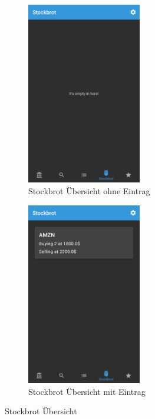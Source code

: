 \documentclass[a4paper]{article}
\begin{document}
\begin{figure}[H]
    \begin{subfigure}{.5\textwidth}
        \centering
        \includegraphics[height=8cm,keepaspectratio]{./images/stockbrot_list_empty.png}  
        \caption{Stockbrot Übersicht ohne Eintrag}
        \label{fig:functionality:stockbrot:overview:empty}
    \end{subfigure}
    \begin{subfigure}{.5\textwidth}
        \centering
        \includegraphics[height=8cm,keepaspectratio]{./images/stockbrot_list.png}  
        \caption{Stockbrot Übersicht mit Eintrag}
        \label{fig:functionality:stockbrot:overview:entry}
    \end{subfigure}
    \caption{Stockbrot Übersicht}
    \label{fig:functionality:stockbrot:overview}
\end{figure}
\end{document}

